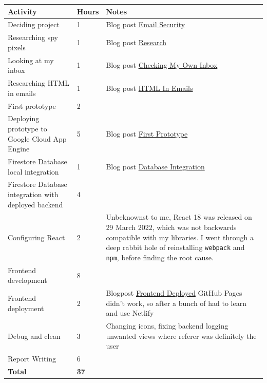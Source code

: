 \documentclass{article}
\begin{document}
\begin{center}
\begin{tabular}{ |m{}|l|m{}| }
    \hline
    \textbf{Activity} & \textbf{Hours} & \textbf{Notes} \\ 
    \hline\hline
    Deciding project & 1 & Blog post \href{https://www.openlearning.com/u/hayeschoy-r7a9ti/blog/SomethingAwesomeEmailSecurity/}{Email Security} \\  
    \hline
    Researching spy pixels & 1 & Blog post \href{https://www.openlearning.com/u/hayeschoy-r7a9ti/blog/SomethingAwesomeResearch3March/}{Research} \\
    \hline
    Looking at my inbox & 1 & Blog post \href{https://www.openlearning.com/u/hayeschoy-r7a9ti/blog/SomethingAwesomeCheckingMyOwnInbox10March/}{Checking My Own Inbox} \\
    \hline
    Researching HTML in emails & 1 & Blog post \href{https://www.openlearning.com/u/hayeschoy-r7a9ti/blog/SomethingAwesomeHtmlInEmails22March/}{HTML In Emails} \\
    \hline
    First prototype & 2 &  \\
    \hline
    Deploying prototype to Google Cloud App Engine & 5 & Blog post \href{https://www.openlearning.com/u/hayeschoy-r7a9ti/blog/SomethingAwesomeFirstPrototype/}{First Prototype} \\
    \hline
    Firestore Database local integration & 1 & Blog post \href{https://www.openlearning.com/u/hayeschoy-r7a9ti/blog/SomethingAwesomeDatabaseIntegration/}{Database Integration} \\
    \hline
    Firestore Database integration with deployed backend & 4 & \\
    \hline
    Configuring React & 2 & Unbeknownst to me, React 18 was released on 29 March 2022, which was not backwards compatible with my libraries. I went through a deep rabbit hole of reinstalling \texttt{webpack} and \texttt{npm}, before finding the root cause. \\
    \hline
    Frontend development & 8 &  \\
    \hline
    Frontend deployment & 2 & Blogpost \href{https://www.openlearning.com/u/hayeschoy-r7a9ti/blog/SomethingAwesomeFrontendDeployed/}{Frontend Deployed} \newline GitHub Pages didn't work, so after a bunch of  had to learn and use Netlify \\
    \hline
    Debug and clean & 3 & Changing icons, fixing backend logging unwanted views where referer was definitely the user \\
    \hline
    Report Writing & 6 & \\   
    \hline\hline
    
    \textbf{Total} & \textbf{37} & \\
    \hline
\end{tabular}
\end{center}
\end{document}
